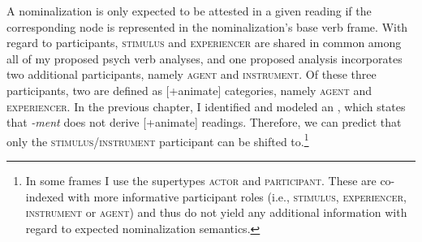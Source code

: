 A nominalization is only expected to be attested in a given reading if the corresponding node is represented in the nominalization's base verb frame. With regard to participants, \textsc{stimulus} and \textsc{experiencer} are shared in common among all of my proposed psych verb analyses, and one proposed analysis incorporates two additional participants, namely \textsc{agent} and \textsc{instrument}. Of these three participants, two are defined as [+animate] categories, namely \textsc{agent} and \textsc{experiencer}. In the previous chapter, I identified and modeled an , which states that \textit{-ment} does not derive [+animate] readings. Therefore, we can predict that only the \textsc{stimulus/instrument} participant can be shifted to.\footnote{In some frames I use the supertypes \textsc{actor} and \textsc{participant}. These are co-indexed with more informative participant roles (i.e., \textsc{stimulus}, \textsc{experiencer}, \textsc{instrument} or \textsc{agent}) and thus do not yield any additional information with regard to expected nominalization semantics.} 

